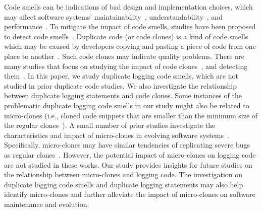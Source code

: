 Code smells can be indications of bad design and implementation choices, which may affect software systems' maintainability~\cite{7194592,Ahmed:2017:EER:3200492.3200502,6392174, dannydigmobisoft}, understandability~\cite{8115653, 6065171}, and performance~\cite{10.1007/978-3-319-26529-2_18}. To mitigate the impact of code smells, studies have been proposed to detect code smells~\cite{6693086,Nguyen:2012:DEC:2351676.2351724,Parnin:2008:CLV:1409720.1409733, Schumacher:2010:BES:1852786.1852797, DBLP:journals/ese/HermansPD15}. Duplicate code (or code clones) is a kind of code smells which may be caused by developers copying and pasting a piece of code from one place to another~\cite{5463343, tracyhallcodesmell}. Such code clones may indicate quality problems. %
There are many studies that focus on studying the impact of code clones~\cite{DoCodeClonesMatter, kapser2006a,FrequencyAndRisksClones}, and detecting them~\cite{kamiya2002, cpminer, nicad}. In this paper, we study duplicate logging code smells, which are not studied in prior duplicate code studies. We also investigate the relationship between duplicate logging statements and code clones.
 Some instances of the problematic duplicate logging code smells in our study might also be related to micro-clones (i.e., cloned code snippets that are smaller than the minimum size of the regular clones~\cite{microclones}). A small number of prior studies investigate the characteristics and impact of micro-clones in evolving software systems~\cite{MicroclonesAndBugsSANER,MicroclonesAndBugsICPC,microclones,microclone4,microclone5}. Specifically, micro-clones may have similar tendencies of replicating severe bugs as regular clones~\cite{MicroclonesAndBugsICPC, MicroclonesAndBugsSANER}. However, the potential impact of micro-clones on logging code are not studied in these works. Our study provides insights for future studies on the relationship between micro-clones and logging code. The investigation on duplicate logging code smells and duplicate logging statements may also help identify micro-clones and further alleviate the impact of micro-clones on software maintenance and evolution.




